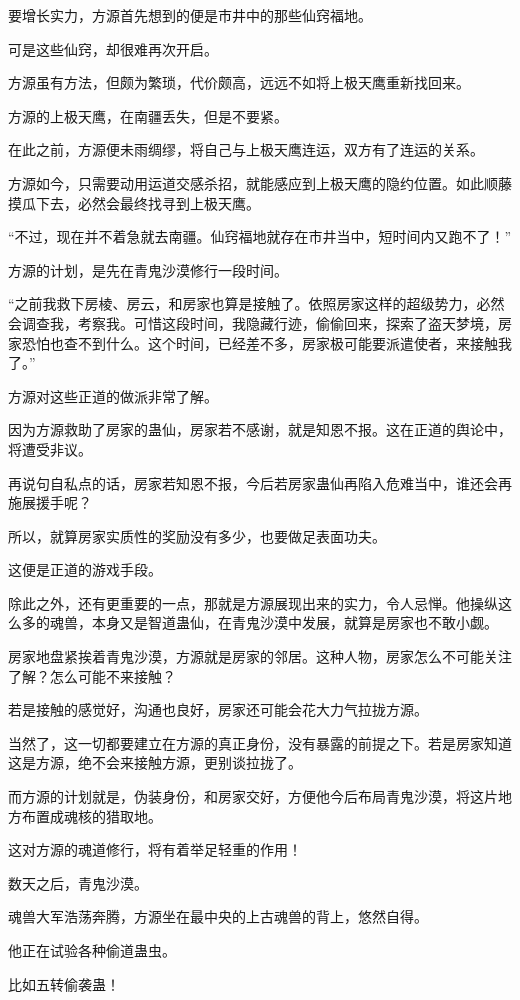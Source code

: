 \begin{this_body}
要增长实力，方源首先想到的便是市井中的那些仙窍福地。

可是这些仙窍，却很难再次开启。

方源虽有方法，但颇为繁琐，代价颇高，远远不如将上极天鹰重新找回来。

方源的上极天鹰，在南疆丢失，但是不要紧。

在此之前，方源便未雨绸缪，将自己与上极天鹰连运，双方有了连运的关系。

方源如今，只需要动用运道交感杀招，就能感应到上极天鹰的隐约位置。如此顺藤摸瓜下去，必然会最终找寻到上极天鹰。

“不过，现在并不着急就去南疆。仙窍福地就存在市井当中，短时间内又跑不了！”

方源的计划，是先在青鬼沙漠修行一段时间。

“之前我救下房棱、房云，和房家也算是接触了。依照房家这样的超级势力，必然会调查我，考察我。可惜这段时间，我隐藏行迹，偷偷回来，探索了盗天梦境，房家恐怕也查不到什么。这个时间，已经差不多，房家极可能要派遣使者，来接触我了。”

方源对这些正道的做派非常了解。

因为方源救助了房家的蛊仙，房家若不感谢，就是知恩不报。这在正道的舆论中，将遭受非议。

再说句自私点的话，房家若知恩不报，今后若房家蛊仙再陷入危难当中，谁还会再施展援手呢？

所以，就算房家实质性的奖励没有多少，也要做足表面功夫。

这便是正道的游戏手段。

除此之外，还有更重要的一点，那就是方源展现出来的实力，令人忌惮。他操纵这么多的魂兽，本身又是智道蛊仙，在青鬼沙漠中发展，就算是房家也不敢小觑。

房家地盘紧挨着青鬼沙漠，方源就是房家的邻居。这种人物，房家怎么不可能关注了解？怎么可能不来接触？

若是接触的感觉好，沟通也良好，房家还可能会花大力气拉拢方源。

当然了，这一切都要建立在方源的真正身份，没有暴露的前提之下。若是房家知道这是方源，绝不会来接触方源，更别谈拉拢了。

而方源的计划就是，伪装身份，和房家交好，方便他今后布局青鬼沙漠，将这片地方布置成魂核的猎取地。

这对方源的魂道修行，将有着举足轻重的作用！

数天之后，青鬼沙漠。

魂兽大军浩荡奔腾，方源坐在最中央的上古魂兽的背上，悠然自得。

他正在试验各种偷道蛊虫。

比如五转偷袭蛊！


\end{this_body}
